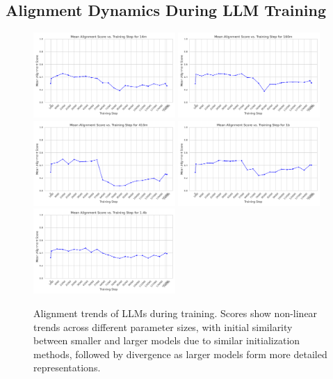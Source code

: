 \documentclass[10pt,a4paper]{article}
\begin{document}
\subsection{Alignment Dynamics During LLM Training}
\begin{figure}[H]
    \centering
    \includegraphics[width=0.48\textwidth]{mean_alignment_score_14m.png}
    \includegraphics[width=0.48\textwidth]{mean_alignment_score_160m.png}
    \includegraphics[width=0.48\textwidth]{mean_alignment_score_410m.png}
    \includegraphics[width=0.48\textwidth]{mean_alignment_score_1b.png}
    \includegraphics[width=0.48\textwidth]{mean_alignment_score_1.4b.png}
    \caption{Alignment trends of LLMs during training. Scores show non-linear trends across different parameter sizes, with initial similarity between smaller and larger models due to similar initialization methods, followed by divergence as larger models form more detailed representations.}
    \label{fig:llm_training_alignment}
\end{figure}
\end{document}
